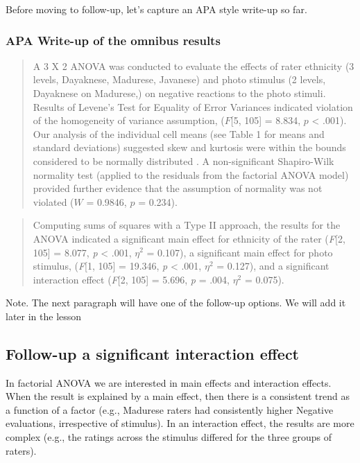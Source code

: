 \documentclass[
  11pt,
]{book}
\begin{document}
Before moving to follow-up, let's capture an APA style write-up so far.

\hypertarget{apa-write-up-of-the-omnibus-results}{%
\subsubsection{APA Write-up of the omnibus results}\label{apa-write-up-of-the-omnibus-results}}

\begin{quote}
A 3 X 2 ANOVA was conducted to evaluate the effects of rater ethnicity (3 levels, Dayaknese, Madurese, Javanese) and photo stimulus (2 levels, Dayaknese on Madurese,) on negative reactions to the photo stimuli. Results of Levene's Test for Equality of Error Variances indicated violation of the homogeneity of variance assumption, (\(F\){[}5, 105{]} = 8.834, \(p\) \textless{} .001). Our analysis of the individual cell means (see Table 1 for means and standard deviations) suggested skew and kurtosis were within the bounds considered to be normally distributed \citep{kline_principles_2016}. A non-significant Shapiro-Wilk normality test (applied to the residuals from the factorial ANOVA model) provided further evidence that the assumption of normality was not violated (\(W\) = 0.9846, \(p\) = 0.234).
\end{quote}

\begin{quote}
Computing sums of squares with a Type II approach, the results for the ANOVA indicated a significant main effect for ethnicity of the rater (\emph{F}{[}2, 105{]} = 8.077, \emph{p} \textless{} .001, \(\eta ^{2}\) = 0.107), a significant main effect for photo stimulus, (\emph{F}{[}1, 105{]} = 19.346, \emph{p} \textless{} .001, \(\eta ^{2}\) = 0.127), and a significant interaction effect (\emph{F}{[}2, 105{]} = 5.696, \emph{p} = .004, \(\eta ^{2}\) = 0.075).
\end{quote}

Note. The next paragraph will have one of the follow-up options. We will add it later in the lesson

\hypertarget{follow-up-a-significant-interaction-effect}{%
\subsection{Follow-up a significant interaction effect}\label{follow-up-a-significant-interaction-effect}}

In factorial ANOVA we are interested in main effects and interaction effects. When the result is explained by a main effect, then there is a consistent trend as a function of a factor (e.g., Madurese raters had consistently higher Negative evaluations, irrespective of stimulus). In an interaction effect, the results are more complex (e.g., the ratings across the stimulus differed for the three groups of raters).
\end{document}
